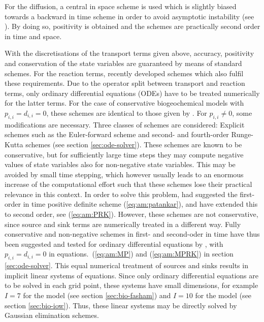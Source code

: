 For the diffusion, a
central in space scheme is used which is slightly biased towards
a backward in time scheme in order to avoid asymptotic instability
(see \cite{Samarskij84}). By doing so, positivity is obtained and the schemes
are practically second order in time and space.

With the discretisations of the transport terms given above,
accuracy, positivity and conservation of the state variables are
guaranteed by means of standard schemes. For the reaction terms,
\cite{Burchardetal2003b} recently developed schemes which also fulfil these
requirements.
Due to the operator split between transport and reaction terms,
only ordinary differential equations (ODEs)
have to be treated numerically for the latter terms.
For the case of conservative biogeochemical models with
$p_{i,i}=d_{i,i}=0$, these schemes are identical to those given
by \cite{Burchardetal2003b}.
For $p_{i,i}\not= 0$, some modifications are necessary.
Three classes of schemes are considered:
Explicit schemes such as the Euler-forward scheme and second- and
fourth-order Runge-Kutta schemes (see section \ref{sec:ode-solver}).
These schemes are known to be conservative, but for
sufficiently large time steps they may compute negative values
of state variables also for non-negative state variables.
This may be avoided by small time stepping, which however usually
leads to an enormous increase of the computational effort such that
these schemes lose their practical relevance in this context.
In order to solve this problem,
\cite{Patankar80} had suggested the first-order in time
positive definite scheme
(\ref{eq:am:patankar}), and \cite{Burchardetal2003b} have extended this
to second order, see (\ref{eq:am:PRK}).
However, these schemes are not conservative, since
source and sink terms are numerically treated in a different way.
Fully conservative and non-negative schemes in first- and second-oder
in time have thus been suggested and tested for
ordinary differential equations by \cite{Burchardetal2003b},
with $p_{i,i}=d_{i,i}=0$ in equations.\ (\ref{eq:am:MP}) and (\ref{eq:am:MPRK})
in section \ref{sec:ode-solver}.
This equal numerical treatment of sources and sinks
results in implicit linear systems of equations.
Since only ordinary differential equations are to be solved in each
grid point, these systems have small dimensions, for example $I=7$ for
the \cite{Fashametal1990} model (see section \ref{sec:bio-fasham}) and
$I=10$ for the \cite{Neumannetal2002} model 
(see section \ref{sec:bio-iow}).
Thus, these linear systems may be directly solved
by Gaussian elimination schemes.
